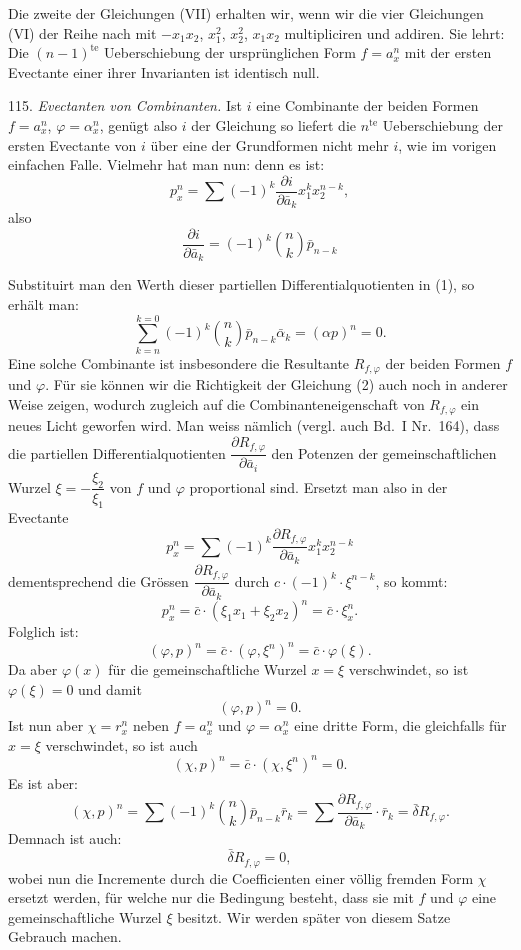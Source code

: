 Die zweite der Gleichungen (VII) erhalten wir, wenn wir die vier Gleichungen (VI) der Reihe nach mit $-x_1x_2$, $x_1^2$, $x_2^2$, $x_1x_2$ multipliciren und addiren. Sie lehrt:
\glqq Die $(n-1)^{\text{te}}$ Ueberschiebung der ursprünglichen Form $f=a_x^n$ mit der ersten Evectante einer ihrer Invarianten ist identisch null.\grqq{}

115. \textit{Evectanten von Combinanten.} Ist $i$ eine Combinante der beiden Formen $f=a_x^n$, $\varphi=\alpha_x^n$, genügt also $i$ der Gleichung
so liefert die $n^{\text{te}}$ Ueberschiebung der ersten Evectante von $i$ über eine der Grundformen nicht mehr $i$, wie im vorigen einfachen Falle. Vielmehr hat man nun:
denn es ist:
\[
p_x^n = \sum (-1)^k \frac{\partial i}{\partial \bar a_k} x_1^k x_2^{n-k},
\]
also
\[
\frac{\partial i}{\partial \bar a_k} = (-1)^k \binom{n}{k} \bar p_{n-k}
\]


Substituirt man den Werth dieser partiellen Differentialquotienten in (1), so erhält man:
\[
\sum_{k=n}^{k=0} (-1)^k \binom{n}{k} \bar p_{n-k} \bar\alpha_k = (\alpha p)^n = 0.
\]
Eine solche Combinante ist insbesondere die Resultante $R_{f,\varphi}$ der beiden Formen $f$ und $\varphi$. Für sie können wir die Richtigkeit der Gleichung (2) auch noch in anderer Weise zeigen, wodurch zugleich auf die Combinanteneigenschaft von $R_{f,\varphi}$ ein neues Licht geworfen wird. Man weiss nämlich (vergl. auch Bd.~I Nr.~164), dass die partiellen Differentialquotienten $\dfrac{\partial R_{f,\varphi}}{\partial \bar a_i}$ den Potenzen der gemeinschaftlichen Wurzel $\xi = -\dfrac{\xi_2}{\xi_1}$ von $f$ und $\varphi$ proportional sind. Ersetzt man also in der Evectante
\[
p_x^n = \sum (-1)^k \frac{\partial R_{f,\varphi}}{\partial \bar a_k} x_1^k x_2^{n-k}
\]
dementsprechend die Grössen $\dfrac{\partial R_{f,\varphi}}{\partial \bar a_k}$ durch $c\cdot(-1)^k\cdot\xi^{n-k}$, so kommt:
\[
p_x^n = \bar c \cdot (\xi_1 x_1 + \xi_2 x_2)^n = \bar c \cdot \xi_x^n.
\]
Folglich ist:
\[
(\varphi, p)^n = \bar c \cdot (\varphi, \xi^n)^n = \bar c \cdot \varphi(\xi).
\]
Da aber $\varphi(x)$ für die gemeinschaftliche Wurzel $x=\xi$ verschwindet, so ist $\varphi(\xi)=0$ und damit
\[
(\varphi, p)^n = 0.
\]
Ist nun aber $\chi = r_x^n$ neben $f=a_x^n$ und $\varphi=\alpha_x^n$ eine dritte Form, die gleichfalls für $x=\xi$ verschwindet, so ist auch
\[
(\chi, p)^n = \bar c \cdot (\chi, \xi^n)^n = 0.
\]
Es ist aber:
\[
(\chi, p)^n = \sum (-1)^k \binom{n}{k} \bar p_{n-k} \bar r_k = \sum \frac{\partial R_{f,\varphi}}{\partial \bar a_k} \cdot \bar r_k = \bar\delta R_{f,\varphi}.
\]
Demnach ist auch:
\[
\bar\delta R_{f,\varphi} = 0,
\]
wobei nun die Incremente durch die Coefficienten einer völlig fremden Form $\chi$ ersetzt werden, für welche nur die Bedingung besteht, dass sie mit $f$ und $\varphi$ eine gemeinschaftliche Wurzel $\xi$ besitzt. Wir werden später von diesem Satze Gebrauch machen.

